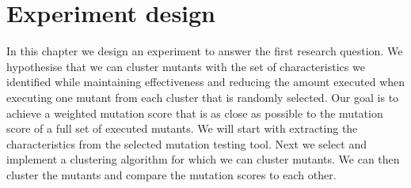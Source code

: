 \documentclass[../../main]{subfiles}
\begin{document}
\clearpage
\section{Experiment design}
In this chapter we design an experiment to answer the first research question.
We hypothesise that we can cluster mutants with the set of characteristics we identified
while maintaining effectiveness and reducing the amount executed when executing one mutant from each cluster that is randomly selected.
Our goal is to achieve a weighted mutation score that is as close as possible to the mutation score of a full set of executed mutants.
\newline
We will start with extracting the characteristics from the selected mutation testing tool. 
Next we select and implement a clustering algorithm for which we can cluster mutants.
We can then cluster the mutants and compare the mutation scores to each other. 
\end{document}
